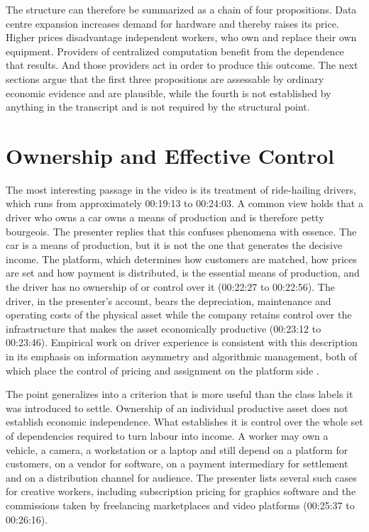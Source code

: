 \documentclass[11pt]{article}
\theoremstyle{plain}
\theoremstyle{definition}
\begin{document}
The structure can therefore be summarized as a chain of four propositions. Data centre expansion increases demand for hardware and thereby raises its price. Higher prices disadvantage independent workers, who own and replace their own equipment. Providers of centralized computation benefit from the dependence that results. And those providers act in order to produce this outcome. The next sections argue that the first three propositions are assessable by ordinary economic evidence and are plausible, while the fourth is not established by anything in the transcript and is not required by the structural point.

\section{Ownership and Effective Control}

The most interesting passage in the video is its treatment of ride-hailing drivers, which runs from approximately 00:19:13 to 00:24:03. A common view holds that a driver who owns a car owns a means of production and is therefore petty bourgeois. The presenter replies that this confuses phenomena with essence. The car is a means of production, but it is not the one that generates the decisive income. The platform, which determines how customers are matched, how prices are set and how payment is distributed, is the essential means of production, and the driver has no ownership of or control over it (00:22:27 to 00:22:56). The driver, in the presenter's account, bears the depreciation, maintenance and operating costs of the physical asset while the company retains control over the infrastructure that makes the asset economically productive (00:23:12 to 00:23:46). Empirical work on driver experience is consistent with this description in its emphasis on information asymmetry and algorithmic management, both of which place the control of pricing and assignment on the platform side \cite{rosenblat}.

The point generalizes into a criterion that is more useful than the class labels it was introduced to settle. Ownership of an individual productive asset does not establish economic independence. What establishes it is control over the whole set of dependencies required to turn labour into income. A worker may own a vehicle, a camera, a workstation or a laptop and still depend on a platform for customers, on a vendor for software, on a payment intermediary for settlement and on a distribution channel for audience. The presenter lists several such cases for creative workers, including subscription pricing for graphics software and the commissions taken by freelancing marketplaces and video platforms (00:25:37 to 00:26:16).
\end{document}
